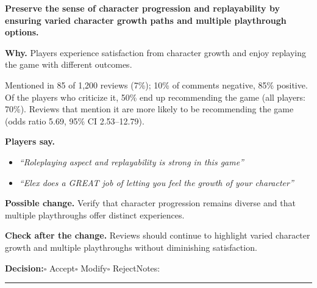 \documentclass[10pt]{article}
\begin{document}
\begin{tcolorbox}[colback=white,colframe=gP,colbacktitle=lP,coltitle=black,title={\textbf{P5}\quad Character Growth and Replayability\hfill\textcolor{gP}{\textbf{Protect}}},boxrule=0.8pt,arc=2pt,left=6pt,right=6pt,top=4pt,bottom=4pt,before skip=8pt,after skip=8pt]
{\large\textbf{Preserve the sense of character progression and replayability by ensuring varied character growth paths and multiple playthrough options.}}

\smallskip
\textbf{Why.} Players experience satisfaction from character growth and enjoy replaying the game with different outcomes.

\smallskip
{\small Mentioned in 85 of 1,200 reviews (7\%); 10\% of comments negative, 85\% positive. Of the players who criticize it, 50\% end up recommending the game (all players: 70\%). Reviews that mention it are more likely to be recommending the game {\color{ink2}\footnotesize(odds ratio 5.69, 95\% CI 2.53--12.79)}.}

\smallskip
\textbf{Players say.}
\begin{itemize}[leftmargin=12pt,itemsep=1pt,topsep=2pt]
    \item \textit{``Roleplaying aspect and replayability is strong in this game''}
    \item \textit{``Elex does a GREAT job of letting you feel the growth of your character''}
\end{itemize}
\textbf{Possible change.} Verify that character progression remains diverse and that multiple playthroughs offer distinct experiences.

\smallskip
\textbf{Check after the change.} Reviews should continue to highlight varied character growth and multiple playthroughs without diminishing satisfaction.

\medskip
{\small\textbf{Decision:}\quad $\square$ Accept\quad $\square$ Modify\quad $\square$ Reject\qquad Notes: \rule{0.38\linewidth}{0.4pt}}
\end{tcolorbox}
\end{document}
